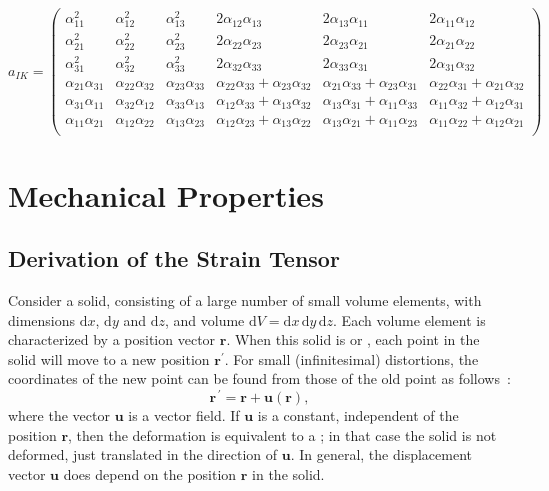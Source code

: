 {\small\begin{equation}
a_{IK} = \left(\begin{array}{cccccc}
		\alpha^2_{11}&\alpha^2_{12}&\alpha^2_{13} &2\alpha_{12}\alpha_{13} &2\alpha_{13}\alpha_{11} &2\alpha_{11}\alpha_{12} \\
		\alpha^2_{21}&\alpha^2_{22}&\alpha^2_{23} &2\alpha_{22}\alpha_{23} &2\alpha_{23}\alpha_{21} &2\alpha_{21}\alpha_{22} \\
		\alpha^2_{31}&\alpha^2_{32}&\alpha^2_{33} &2\alpha_{32}\alpha_{33} &2\alpha_{33}\alpha_{31} &2\alpha_{31}\alpha_{32} \\
		\alpha_{21}\alpha_{31}&\alpha_{22}\alpha_{32} &\alpha_{23}\alpha_{33} &\alpha_{22}\alpha_{33}+\alpha_{23}\alpha_{32} &\alpha_{21}\alpha_{33}+\alpha_{23}\alpha_{31} &\alpha_{22}\alpha_{31}+\alpha_{21}\alpha_{32} \\
		\alpha_{31}\alpha_{11}&\alpha_{32}\alpha_{12} &\alpha_{33}\alpha_{13} &\alpha_{12}\alpha_{33}+\alpha_{13}\alpha_{32} &\alpha_{13}\alpha_{31}+\alpha_{11}\alpha_{33} &\alpha_{11}\alpha_{32}+\alpha_{12}\alpha_{31} \\
		\alpha_{11}\alpha_{21}&\alpha_{12}\alpha_{22} &\alpha_{13}\alpha_{23} &\alpha_{12}\alpha_{23}+\alpha_{13}\alpha_{22} &\alpha_{13}\alpha_{21}+\alpha_{11}\alpha_{23} &\alpha_{11}\alpha_{22}+\alpha_{12}\alpha_{21} \\
		\end{array}\right)\label{\chabbr:eq:aIK}
\end{equation}}

\section{Mechanical Properties}\label{\chabbr:sec:mechprop}

\subsection{Derivation of the Strain Tensor}

Consider a solid, consisting of a large number of small volume elements, with dimensions $\mathrm{d}x$, $\mathrm{d}y$ and $\mathrm{d}z$, and volume $\mathrm{d}V=\mathrm{d}x\,\mathrm{d}y\,\mathrm{d}z$.  Each volume element is characterized by a position vector $\mathbf{r}$.  When this solid is  or , each point in the solid will move to a new position $\mathbf{r}^{\prime}$.  For small (infinitesimal) distortions, the coordinates of the new point can be found from those of the old point as follows~:
\[
\mathbf{r}^{\,\prime}=\mathbf{r}+\mathbf{u}(\mathbf{r}),
\]
where the vector $\mathbf{u}$ is a  vector field.  If $\mathbf{u}$ is a constant, independent of the position $\mathbf{r}$, then the deformation is equivalent to a ;  in that case the solid is not deformed, just translated in the direction of $\mathbf{u}$.  In general, the displacement vector $\mathbf{u}$ does depend on the position $\mathbf{r}$ in the solid.  

